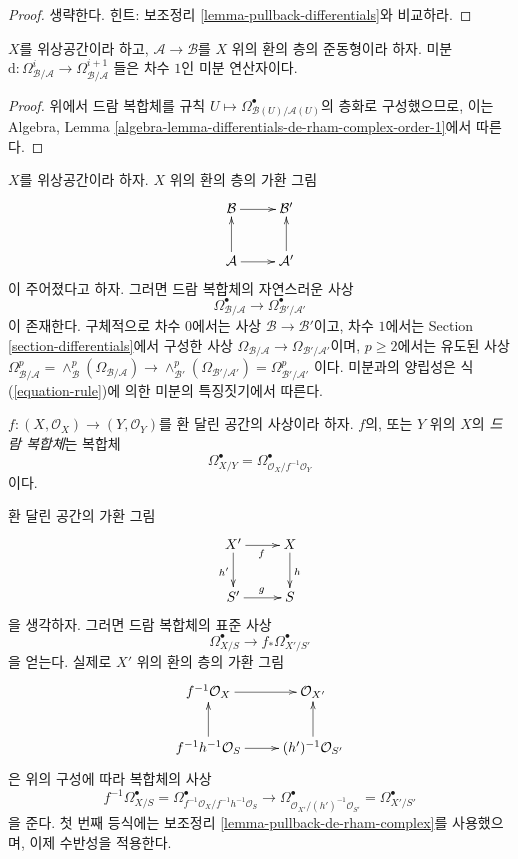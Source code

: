 \begin{proof}
생략한다. 힌트: 보조정리 \ref{lemma-pullback-differentials}와 비교하라.
\end{proof}

\begin{lemma}
\label{lemma-differentials-de-rham-complex-order-1}
$X$를 위상공간이라 하고, $\mathcal{A} \to \mathcal{B}$를
$X$ 위의 환의 층의 준동형이라 하자. 미분
$\text{d} : \Omega^i_{\mathcal{B}/\mathcal{A}}  \to
\Omega^{i + 1}_{\mathcal{B}/\mathcal{A}}$
들은 차수 $1$인 미분 연산자이다.
\end{lemma}

\begin{proof}
위에서 드람 복합체를 규칙
$U \mapsto \Omega^\bullet_{\mathcal{B}(U)/\mathcal{A}(U)}$의 층화로
구성했으므로, 이는 Algebra, Lemma
\ref{algebra-lemma-differentials-de-rham-complex-order-1}에서 따른다.
\end{proof}

\noindent
$X$를 위상공간이라 하자. $X$ 위의 환의 층의 가환 그림
$$
\xymatrix{
\mathcal{B} \ar[r] & \mathcal{B}' \\
\mathcal{A} \ar[r] \ar[u] & \mathcal{A}' \ar[u]
}
$$
이 주어졌다고 하자. 그러면 드람 복합체의 자연스러운 사상
$$
\Omega^\bullet_{\mathcal{B}/\mathcal{A}} \longrightarrow
\Omega^\bullet_{\mathcal{B}'/\mathcal{A}'}
$$
이 존재한다. 구체적으로 차수 $0$에서는 사상
$\mathcal{B} \to \mathcal{B}'$이고, 차수 $1$에서는 Section
\ref{section-differentials}에서 구성한 사상
$\Omega_{\mathcal{B}/\mathcal{A}} \to \Omega_{\mathcal{B}'/\mathcal{A}'}$이며,
$p \geq 2$에서는 유도된 사상
$\Omega^p_{\mathcal{B}/\mathcal{A}} =
\wedge^p_\mathcal{B}(\Omega_{\mathcal{B}/\mathcal{A}}) \to
\wedge^p_{\mathcal{B}'}(\Omega_{\mathcal{B}'/\mathcal{A}'}) =
\Omega^p_{\mathcal{B}'/\mathcal{A}'}$
이다. 미분과의 양립성은 식 (\ref{equation-rule})에 의한 미분의
특징짓기에서 따른다.

\begin{definition}
\label{definition-de-rham-complex-morphism-ringed-spaces}
$f : (X, \mathcal{O}_X) \to (Y, \mathcal{O}_Y)$를 환 달린 공간의
사상이라 하자. $f$의, 또는 $Y$ 위의 $X$의 {\it 드람 복합체}는 복합체
$$
\Omega^\bullet_{X/Y} = \Omega^\bullet_{\mathcal{O}_X/f^{-1}\mathcal{O}_Y}
$$
이다.
\end{definition}

\noindent
환 달린 공간의 가환 그림
$$
\xymatrix{
X' \ar[d]_{h'} \ar[r]_f & X \ar[d]^h \\
S' \ar[r]^g & S
}
$$
을 생각하자. 그러면 드람 복합체의 표준 사상
$$
\Omega^\bullet_{X/S} \to f_*\Omega^\bullet_{X'/S'}
$$
을 얻는다. 실제로 $X'$ 위의 환의 층의 가환 그림
$$
\xymatrix{
f^{-1}\mathcal{O}_X \ar[r] & \mathcal{O}_{X'} \\
f^{-1}h^{-1}\mathcal{O}_S \ar[u] \ar[r] & (h')^{-1}\mathcal{O}_{S'} \ar[u]
}
$$
은 위의 구성에 따라 복합체의 사상
$$
f^{-1}\Omega^\bullet_{X/S} =
\Omega^\bullet_{f^{-1}\mathcal{O}_X/f^{-1}h^{-1}\mathcal{O}_S}
\longrightarrow
\Omega^\bullet_{\mathcal{O}_{X'}/(h')^{-1}\mathcal{O}_{S'}} =
\Omega^\bullet_{X'/S'}
$$
을 준다. 첫 번째 등식에는 보조정리
\ref{lemma-pullback-de-rham-complex}를 사용했으며, 이제 수반성을 적용한다.

